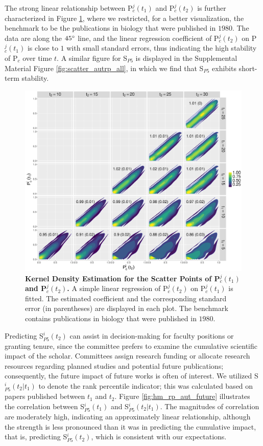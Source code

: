The strong linear relationship between P$_{c}^{j}(t_1)$ and P$_c^{j}(t_2)$ is further characterized in Figure \ref{fig:scatter_pubrp_bio1980}, where we restricted, for a better visualization, the benchmark to be the publications in biology that were published in $1980$. The data are along the $45 \degree$ line, and the linear regression coefficient of P$_c^{j}(t_2)$ on P$_c^{j}(t_1)$ is close to $1$ with small standard errors, thus indicating the high stability of P$_c$ over time $t$. A similar figure for S$_{P5}$ is displayed in the Supplemental Material Figure \ref{fig:scatter_autrp_all}, in which we find that S$_{P5}$ exhibits short-term stability.


\begin{figure}[ht!]
    \centering
    \includegraphics[width=\textwidth]{figures/pred_power/scatter_pubrp_bio1980.eps}
    \caption{{\bf Kernel Density Estimation for the Scatter Points of P$_c^j(t_1)$ and P$_c^j(t_2)$.}
    A simple linear regression of P$_c^{j}(t_2)$ on P$_c^{j}(t_1)$ is fitted. The estimated coefficient and the corresponding standard error (in parentheses) are displayed in each plot. The benchmark contains publications in biology that were published in $1980$.}
    \label{fig:scatter_pubrp_bio1980}
\end{figure}

Predicting S$_{P5}^{i}(t_2)$ can assist in decision-making for faculty positions or granting tenure, since the committee prefers to examine the cumulative scientific impact of the scholar. Committees assign research funding or allocate research resources regarding planned studies and potential future publications; consequently, the future impact of future works is often of interest. We utilized S$_{P5}^{i}(t_2|t_1)$ to denote the rank percentile indicator; this was calculated based on papers published between $t_1$ and $t_2$. Figure \ref{fig:hm_rp_aut_future} illustrates the correlation between S$_{P5}^{i}(t_1)$ and S$_{P5}^{i}(t_2|t_1)$. The magnitudes of correlation are moderately high, indicating an approximately linear relationship, although the strength is less pronounced than it was in predicting the cumulative impact, that is, predicting S$_{P5}^{i}(t_2)$, which is consistent with our expectations.

